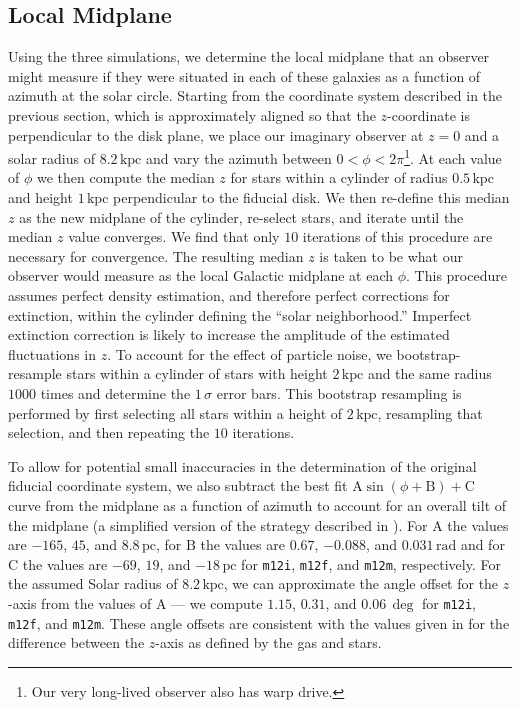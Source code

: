 \documentclass[twocolumn]{aastex62}
\newcommand{\pc}{\text{pc}}
\newcommand{\kpc}{\text{kpc}}
\newcommand{\mi}{\texttt{m12i}}
\newcommand{\mf}{\texttt{m12f}}
\newcommand{\mm}{\texttt{m12m}}
\begin{document}
\subsection{Local Midplane} \label{ssec:local_midplane}
Using the three simulations, we determine the local midplane that an observer
might measure if they were situated in each of these galaxies as a function of
azimuth at the solar circle. Starting from the coordinate system described in
the previous section, which is approximately aligned so that the
$z$-coordinate is perpendicular to the disk plane, we place our imaginary
observer at $z=0$ and a solar radius of $8.2\,\kpc$ and vary the azimuth
between $0<\phi<2\pi$\footnote{Our very long-lived observer also has warp
drive.}. At each value of $\phi$ we then compute the median $z$ for stars
within a cylinder of radius $0.5\,\kpc$ and height $1\,\kpc$ perpendicular to
the fiducial disk. We then re-define this median $z$ as the new midplane of
the cylinder, re-select stars, and iterate until the median $z$ value
converges. We find that only $10$ iterations of this procedure are necessary
for convergence. The resulting median $z$ is taken to be what our observer
would measure as the local Galactic midplane at each $\phi$. This procedure
assumes perfect density estimation, and therefore perfect corrections for
extinction, within the cylinder defining the ``solar neighborhood.'' Imperfect
extinction correction is likely to increase the amplitude of the estimated
fluctuations in $z$. To account for the effect of particle noise, we
bootstrap-resample stars within a cylinder of stars with height $2\,\kpc$ and
the same radius $1000$ times and determine the $1\,\sigma$ error bars. This
bootstrap resampling is performed by first selecting all stars within a height
of $2\,\kpc$, resampling that selection, and then repeating the $10$
iterations.

To allow for potential small inaccuracies in the determination of the original
fiducial coordinate system, we also subtract the best fit $\text{A}
\sin{\left(\phi + \text{B}\right)} + \text{C}$ curve from the midplane as a
function of azimuth to account for an overall tilt of the midplane (a
simplified version of the strategy described in
\citealt{2019ApJ...871..145A}). For $\text{A}$ the values are $-165$, $45$,
and $8.8\,\pc$, for $\text{B}$ the values are $0.67$, $-0.088$, and
$0.031\,\text{rad}$ and for $\text{C}$ the values are $-69$, $19$, and
$-18\,\pc$ for \mi{}, \mf{}, and \mm{}, respectively. For the assumed Solar
radius of $8.2\,\kpc$, we can approximate the angle offset for the $z$-axis
from the values of $\text{A}$ --- we compute $1.15$, $0.31$, and $0.06\,\deg$
for \mi{}, \mf{}, and \mm{}. These angle offsets are consistent with the
values given in \citet{2018arXiv180610564S} for the difference between the
$z$-axis as defined by the gas and stars.
\end{document}
